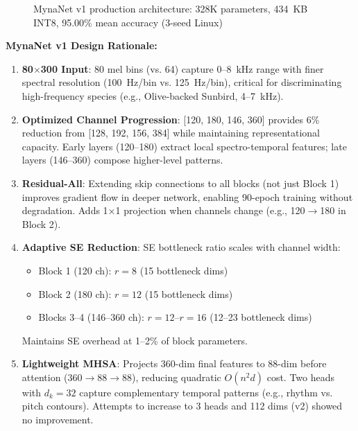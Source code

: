 \documentclass[conference]{IEEEtran}
\begin{document}
\begin{figure}[h]
\caption{MynaNet v1 production architecture: 328K parameters, 434~KB INT8, 95.00\% mean accuracy (3-seed Linux)}
\label{fig:model1e}
\end{figure}

\noindent\textbf{MynaNet v1 Design Rationale:}

\begin{enumerate}
    \item \textbf{80$\times$300 Input}: 80 mel bins (vs. 64) capture 0--8~kHz range with finer spectral resolution (100~Hz/bin vs. 125~Hz/bin), critical for discriminating high-frequency species (e.g., Olive-backed Sunbird, 4--7~kHz).

    \item \textbf{Optimized Channel Progression}: [120, 180, 146, 360] provides 6\% reduction from [128, 192, 156, 384] while maintaining representational capacity. Early layers (120--180) extract local spectro-temporal features; late layers (146--360) compose higher-level patterns.

    \item \textbf{Residual-All}: Extending skip connections to all blocks (not just Block 1) improves gradient flow in deeper network, enabling 90-epoch training without degradation. Adds 1×1 projection when channels change (e.g., 120$\to$180 in Block 2).

    \item \textbf{Adaptive SE Reduction}: SE bottleneck ratio scales with channel width:
    \begin{itemize}
        \item Block 1 (120 ch): $r=8$ (15 bottleneck dims)
        \item Block 2 (180 ch): $r=12$ (15 bottleneck dims)
        \item Blocks 3--4 (146--360 ch): $r=12$--$r=16$ (12--23 bottleneck dims)
    \end{itemize}
    Maintains SE overhead at 1--2\% of block parameters.

    \item \textbf{Lightweight MHSA}: Projects 360-dim final features to 88-dim before attention (360$\to$88$\to$88), reducing quadratic $O(n^2d)$ cost. Two heads with $d_k=32$ capture complementary temporal patterns (e.g., rhythm vs. pitch contours). Attempts to increase to 3 heads and 112 dims (v2) showed no improvement.


\end{enumerate}
\end{document}
